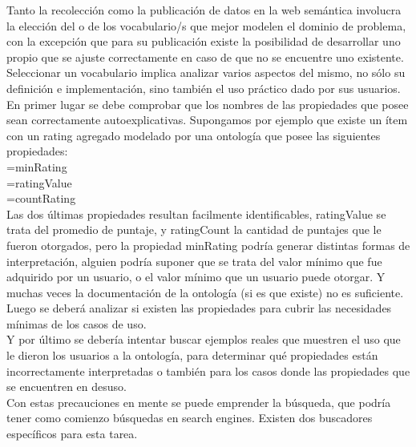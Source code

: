 Tanto la recolección como la publicación de datos en la web semántica involucra la elección del o de los vocabulario/s que 
mejor modelen el dominio de problema, con la excepción que para su publicación existe la posibilidad de desarrollar uno propio 
que se ajuste correctamente en caso de que no se encuentre uno existente. \\
Seleccionar un vocabulario implica analizar varios aspectos del mismo, no sólo su definición e implementación, sino también 
el uso práctico dado por sus usuarios. \\
En primer lugar se debe comprobar que los nombres de las propiedades que posee sean correctamente autoexplicativas. Supongamos 
por ejemplo que existe un ítem con un rating agregado modelado por una ontología que posee las siguientes propiedades:\\
=minRating\\
=ratingValue\\
=countRating\\
Las dos últimas propiedades resultan facilmente identificables, ratingValue se trata del promedio de puntaje, y ratingCount 
la cantidad de puntajes que le fueron otorgados, pero la propiedad minRating podría generar distintas formas de interpretación, 
alguien podría suponer que se trata del valor mínimo que fue adquirido por un usuario, o el valor mínimo que un usuario puede 
otorgar. Y muchas veces la documentación de la ontología (si es que existe) no es suficiente.\\
Luego se deberá analizar si existen las propiedades para cubrir las necesidades mínimas de los casos de uso.\\
Y por último se debería intentar buscar ejemplos reales que muestren el uso que le dieron los usuarios a la ontología, para 
determinar qué propiedades están incorrectamente interpretadas o también para los casos donde las propiedades que se encuentren 
en desuso.\\
Con estas precauciones en mente se puede emprender la búsqueda, que podría tener como comienzo búsquedas en  search engines. 
Existen dos buscadores específicos para esta tarea.\\

